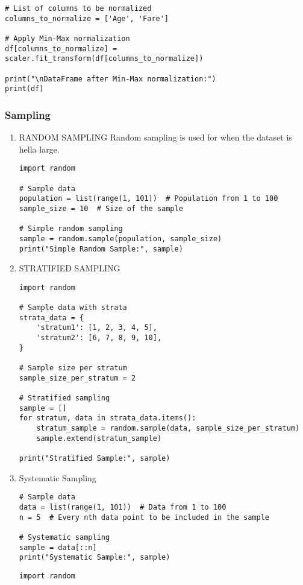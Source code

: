 \documentclass[11pt]{article}
\begin{document}
\begin{enumerate}
\begin{enumerate}
\begin{verbatim}
# List of columns to be normalized
columns_to_normalize = ['Age', 'Fare']

# Apply Min-Max normalization
df[columns_to_normalize] = scaler.fit_transform(df[columns_to_normalize])

print("\nDataFrame after Min-Max normalization:")
print(df)
\end{verbatim}
\end{enumerate}
\end{enumerate}
\subsubsection{Sampling}
\label{sec:org3dfbba4}
\begin{enumerate}
\item RANDOM SAMPLING
\label{sec:orge5f758e}
Random sampling is used for when the dataset is hella large.
\begin{verbatim}
import random

# Sample data
population = list(range(1, 101))  # Population from 1 to 100
sample_size = 10  # Size of the sample

# Simple random sampling
sample = random.sample(population, sample_size)
print("Simple Random Sample:", sample)
\end{verbatim}
\item STRATIFIED SAMPLING
\label{sec:org240fe96}
\begin{verbatim}
import random

# Sample data with strata
strata_data = {
    'stratum1': [1, 2, 3, 4, 5],
    'stratum2': [6, 7, 8, 9, 10],
}

# Sample size per stratum
sample_size_per_stratum = 2

# Stratified sampling
sample = []
for stratum, data in strata_data.items():
    stratum_sample = random.sample(data, sample_size_per_stratum)
    sample.extend(stratum_sample)

print("Stratified Sample:", sample)
\end{verbatim}
\item Systematic Sampling
\label{sec:org92c81d7}
\begin{verbatim}
# Sample data
data = list(range(1, 101))  # Data from 1 to 100
n = 5  # Every nth data point to be included in the sample

# Systematic sampling
sample = data[::n]
print("Systematic Sample:", sample)
\end{verbatim}


\begin{verbatim}
import random


\end{verbatim}
\end{enumerate}
\end{document}
